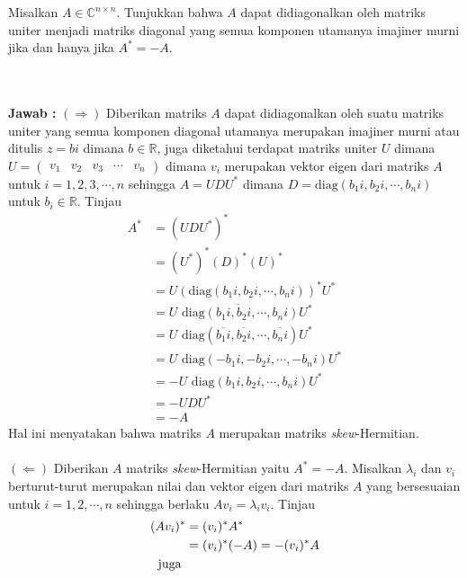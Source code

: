 \documentclass[11pt,a4paper]{article}
\theoremstyle{plain}
\theoremstyle{definition}
\theoremstyle{remark}
\begin{document}
\begin{enumerate}
\begin{enumerate}
	\- \\ \- \\
	\textbf{Jawab :} $(\Rightarrow)$ Diberikan matriks $A$ dapat didiagonalkan oleh suatu matriks uniter yang semua komponen diagonal utamanya merupakan imajiner murni atau ditulis $z=bi$ dimana $b\in \mathbb{R}$, juga diketahui terdapat matriks uniter $U$ dimana $U=\begin{pmatrix}
	v_{1} & v_{2} & v_{3} & \cdots & v_{n}
	\end{pmatrix}$ dimana $v_{i}$ merupakan vektor eigen dari matriks $A$ untuk $i=1,2,3,\cdots,n$ sehingga $A=UDU^*$ dimana $D=\text{diag}(b_{1}i,b_{2}i,\cdots,b_{n}i)$ untuk $b_{i}\in \mathbb{R}$. Tinjau
	\begin{align*}
	A^* &= (UDU^*)^* \\
	&= (U^*)^*(D)^*(U)^* \\
	&= U \left(\text{diag}(b_{1}i,b_{2}i,\cdots,b_{n}i)\right)^* U^* \\
	&= U \overline{\text{ diag}(b_{1}i,b_{2}i,\cdots,b_{n}i)} U^* \\
	&= U \text{ diag}(\overline{b_{1}i},\overline{b_{2}i},\cdots,\overline{b_{n}i}) U^* \\
	&= U \text{ diag}(-b_{1}i,-b_{2}i,\cdots,-b_{n}i) U^* \\
	&= -U \text{ diag}(b_{1}i,b_{2}i,\cdots,b_{n}i) U^* \\
	&= -U D U^* \\
	&= -A
	\end{align*} 
	Hal ini menyatakan bahwa matriks $A$ merupakan matriks \textit{skew}-Hermitian.\\
	\- \\
	$(\Leftarrow)$ Diberikan $A$ matriks \textit{skew}-Hermitian yaitu $A^*=-A$. Misalkan $\lambda_{i}$ dan $v_{i}$ berturut-turut merupakan nilai dan vektor eigen dari matriks $A$ yang bersesuaian untuk $i=1,2,\cdots,n$ sehingga berlaku $Av_{i}=\lambda_{i}v_{i}$. Tinjau
	\begin{align*}
	(Av_{i})^* &= (v_{i})^* A^* \\
	&= (v_{i})^*(-A) = -(v_{i})^*A\\
	\text{juga } & \- \\

\end{align*}
\end{enumerate}
\end{enumerate}
\end{document}
